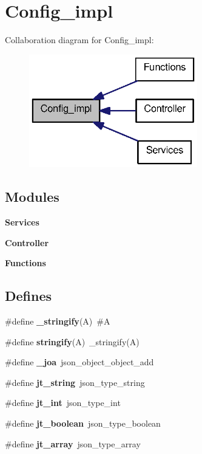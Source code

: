 \section{Config\_\-impl}
\label{group__config__impl}
Collaboration diagram for Config\_\-impl:\nopagebreak
\begin{figure}[H]
\begin{center}
\leavevmode
\includegraphics[width=208pt]{group__config__impl}
\end{center}
\end{figure}
\subsection*{Modules}
\begin{DoxyCompactItemize}
\item 
{\bf Services}
\item 
{\bf Controller}
\item 
{\bf Functions}
\end{DoxyCompactItemize}
\subsection*{Defines}
\begin{DoxyCompactItemize}
\item 
\#define {\bf \_\-stringify}(A)~\#A
\item 
\#define {\bf stringify}(A)~\_\-stringify(A)
\item 
\#define {\bf \_\-joa}~json\_\-object\_\-object\_\-add
\item 
\#define {\bf jt\_\-string}~json\_\-type\_\-string
\item 
\#define {\bf jt\_\-int}~json\_\-type\_\-int
\item 
\#define {\bf jt\_\-boolean}~json\_\-type\_\-boolean
\item 
\#define {\bf jt\_\-array}~json\_\-type\_\-array
\end{DoxyCompactItemize}
